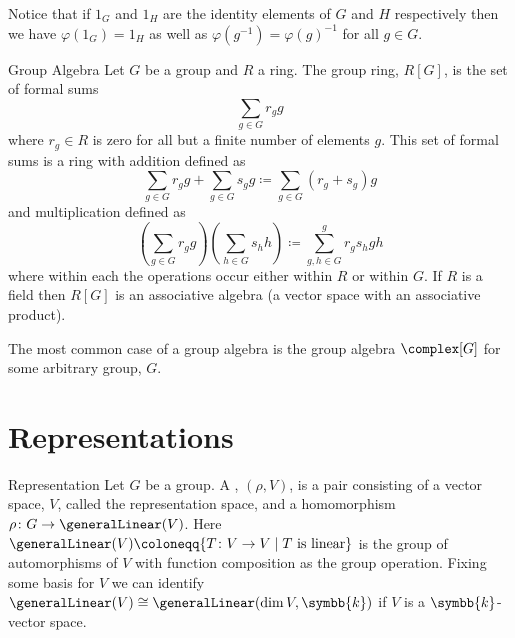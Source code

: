 \documentclass[fleqn]{NotesClass}
\newcommand{\identity}{1}
\renewcommand{\field}{\symbb{k}}
\newcommand{\isomorphic}{\cong}
\begin{document}
    Notice that if \(\identity_G\) and \(\identity_H\) are the identity elements of \(G\) and \(H\) respectively then we have \(\varphi(\identity_G) = \identity_H\) as well as \(\varphi(g^{-1}) = \varphi(g)^{-1}\) for all \(g \in G\).
    
    \begin{dfn}{Group Algebra}{}
        Let \(G\) be a group and \(R\) a ring.
        The group ring, \(R[G]\), is the set of formal sums
        \begin{equation}
            \sum_{g \in G} r_g g
        \end{equation}
        where \(r_g \in R\) is zero for all but a finite number of elements \(g\).
        This set of formal sums is a ring with addition defined as
        \begin{equation}
            \sum_{g \in G} r_g g + \sum_{g \in G} s_g g \coloneqq \sum_{g\in G}(r_g + s_g) g
        \end{equation}
        and multiplication defined as
        \begin{equation}
            \left( \sum_{g \in G} r_g g \right) \left( \sum_{h \in G} s_h h \right) \coloneqq \sum_{g, h \in G}^{g} r_g s_h gh
        \end{equation}
        where within each the operations occur either within \(R\) or within \(G\).
        If \(R\) is a field then \(R[G]\) is an associative algebra (a vector space with an associative product).
    \end{dfn}
    
    The most common case of a group algebra is the group algebra \(\complex[G]\) for some arbitrary group, \(G\).
    
    \section{Representations}
    \begin{dfn}{Representation}{}
        Let \(G\) be a group.
        A , \((\rho, V)\), is a pair consisting of a vector space, \(V\), called the representation space, and a homomorphism \(\rho \colon G \to \generalLinear(V)\).
        Here \(\generalLinear(V) \coloneqq \{T \colon V \to V \mid T \text{ is linear}\}\) is the group of automorphisms of \(V\) with function composition as the group operation.
        Fixing some basis for \(V\) we can identify \(\generalLinear(V) \isomorphic \generalLinear(\dim V, \field)\) if \(V\) is a \(\field\)-vector space.
    \end{dfn}
    
\end{document}

